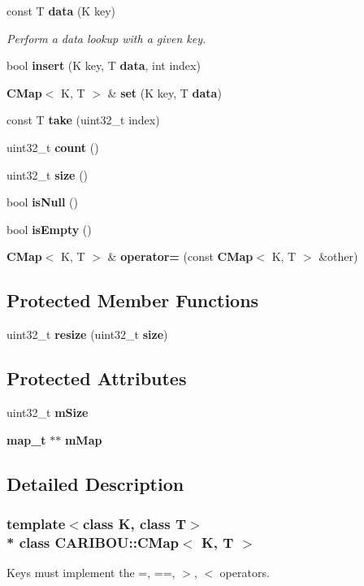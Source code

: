 \begin{DoxyCompactItemize}
const T {\bf data} (K key)
\begin{DoxyCompactList}\small\item\em Perform a data lookup with a given key. \end{DoxyCompactList}\item 
bool {\bf insert} (K key, T {\bf data}, int index)
\item 
{\bf C\+Map}$<$ K, T $>$ \& {\bf set} (K key, T {\bf data})
\item 
const T {\bf take} (uint32\+\_\+t index)
\item 
uint32\+\_\+t {\bf count} ()
\item 
uint32\+\_\+t {\bf size} ()
\item 
bool {\bf is\+Null} ()
\item 
bool {\bf is\+Empty} ()
\item 
{\bf C\+Map}$<$ K, T $>$ \& {\bf operator=} (const {\bf C\+Map}$<$ K, T $>$ \&other)
\end{DoxyCompactItemize}
\subsection*{Protected Member Functions}
\begin{DoxyCompactItemize}
\item 
uint32\+\_\+t {\bf resize} (uint32\+\_\+t {\bf size})
\end{DoxyCompactItemize}
\subsection*{Protected Attributes}
\begin{DoxyCompactItemize}
\item 
uint32\+\_\+t {\bf m\+Size}
\item 
{\bf map\+\_\+t} $\ast$$\ast$ {\bf m\+Map}
\end{DoxyCompactItemize}


\subsection{Detailed Description}
\subsubsection*{template$<$class K, class T$>$\\*
class C\+A\+R\+I\+B\+O\+U\+::\+C\+Map$<$ K, T $>$}

Keys must implement the =, ==, $>$, $<$ operators. 

